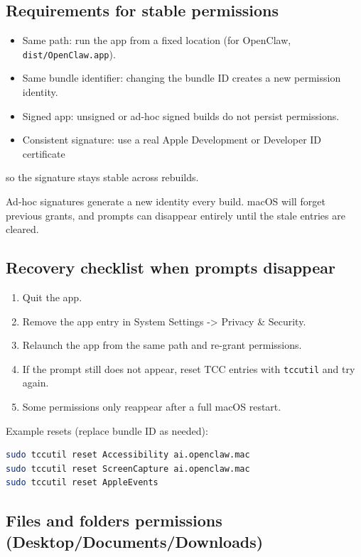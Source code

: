 \subsection{Requirements for stable permissions}


\begin{itemize}
  \item Same path: run the app from a fixed location (for OpenClaw, \texttt{dist/OpenClaw.app}).
  \item Same bundle identifier: changing the bundle ID creates a new permission identity.
  \item Signed app: unsigned or ad-hoc signed builds do not persist permissions.
  \item Consistent signature: use a real Apple Development or Developer ID certificate
\end{itemize}

so the signature stays stable across rebuilds.

Ad-hoc signatures generate a new identity every build. macOS will forget previous
grants, and prompts can disappear entirely until the stale entries are cleared.

\subsection{Recovery checklist when prompts disappear}


\begin{enumerate}
  \item Quit the app.
  \item Remove the app entry in System Settings -> Privacy \& Security.
  \item Relaunch the app from the same path and re-grant permissions.
  \item If the prompt still does not appear, reset TCC entries with \texttt{tccutil} and try again.
  \item Some permissions only reappear after a full macOS restart.
\end{enumerate}


Example resets (replace bundle ID as needed):

\begin{lstlisting}[language=bash]
sudo tccutil reset Accessibility ai.openclaw.mac
sudo tccutil reset ScreenCapture ai.openclaw.mac
sudo tccutil reset AppleEvents
\end{lstlisting}


\subsection{Files and folders permissions (Desktop/Documents/Downloads)}


